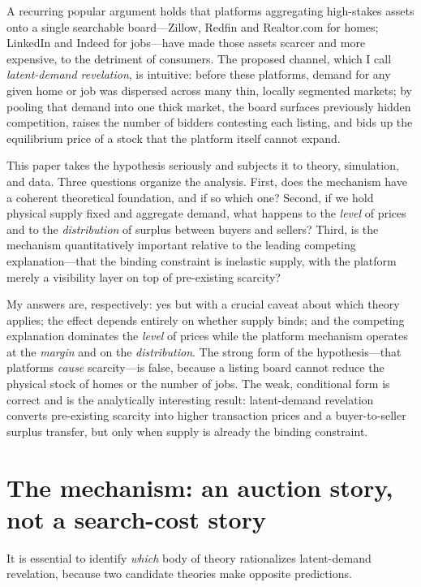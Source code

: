 \documentclass[11pt]{article}
\begin{document}
A recurring popular argument holds that platforms aggregating high-stakes assets onto a single
searchable board---Zillow, Redfin and Realtor.com for homes; LinkedIn and Indeed for jobs---have
made those assets scarcer and more expensive, to the detriment of consumers. The proposed channel,
which I call \emph{latent-demand revelation}, is intuitive: before these platforms, demand for any
given home or job was dispersed across many thin, locally segmented markets; by pooling that demand
into one thick market, the board surfaces previously hidden competition, raises the number of
bidders contesting each listing, and bids up the equilibrium price of a stock that the platform
itself cannot expand.

This paper takes the hypothesis seriously and subjects it to theory, simulation, and data. Three
questions organize the analysis. First, does the mechanism have a coherent theoretical foundation,
and if so which one? Second, if we hold physical supply fixed and aggregate demand, what happens to
the \emph{level} of prices and to the \emph{distribution} of surplus between buyers and sellers?
Third, is the mechanism quantitatively important relative to the leading competing explanation---that
the binding constraint is inelastic supply, with the platform merely a visibility layer on top of
pre-existing scarcity?

My answers are, respectively: yes but with a crucial caveat about which theory applies; the effect
depends entirely on whether supply binds; and the competing explanation dominates the \emph{level}
of prices while the platform mechanism operates at the \emph{margin} and on the \emph{distribution}.
The strong form of the hypothesis---that platforms \emph{cause} scarcity---is false, because a
listing board cannot reduce the physical stock of homes or the number of jobs. The weak, conditional
form is correct and is the analytically interesting result: latent-demand revelation converts
pre-existing scarcity into higher transaction prices and a buyer-to-seller surplus transfer, but
only when supply is already the binding constraint.

\section{The mechanism: an auction story, not a search-cost story}\label{sec:mech}

It is essential to identify \emph{which} body of theory rationalizes latent-demand revelation,
because two candidate theories make opposite predictions.
\end{document}
